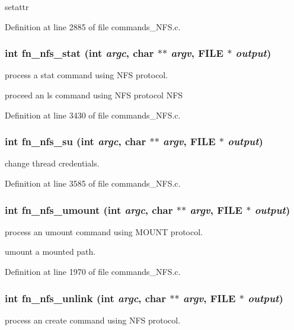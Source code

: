 setattr 

Definition at line 2885 of file commands\_\-NFS.c.
\subsubsection[{fn\_\-nfs\_\-stat}]{\setlength{\rightskip}{0pt plus 5cm}int fn\_\-nfs\_\-stat (int {\em argc}, \/  char $\ast$$\ast$ {\em argv}, \/  FILE $\ast$ {\em output})}\label{commands_8h_a60d880fc087d6b800b305eef1518532b}
process a stat command using NFS protocol.

proceed an ls command using NFS protocol NFS 

Definition at line 3430 of file commands\_\-NFS.c.
\subsubsection[{fn\_\-nfs\_\-su}]{\setlength{\rightskip}{0pt plus 5cm}int fn\_\-nfs\_\-su (int {\em argc}, \/  char $\ast$$\ast$ {\em argv}, \/  FILE $\ast$ {\em output})}\label{commands_8h_a467b8bbb73091f0399b2f9d15a2de9d5}
change thread credentials. 

Definition at line 3585 of file commands\_\-NFS.c.
\subsubsection[{fn\_\-nfs\_\-umount}]{\setlength{\rightskip}{0pt plus 5cm}int fn\_\-nfs\_\-umount (int {\em argc}, \/  char $\ast$$\ast$ {\em argv}, \/  FILE $\ast$ {\em output})}\label{commands_8h_ad3705a7ae5f94ea44dc6ad4da82a38e7}
process an umount command using MOUNT protocol.

umount a mounted path. 

Definition at line 1970 of file commands\_\-NFS.c.
\subsubsection[{fn\_\-nfs\_\-unlink}]{\setlength{\rightskip}{0pt plus 5cm}int fn\_\-nfs\_\-unlink (int {\em argc}, \/  char $\ast$$\ast$ {\em argv}, \/  FILE $\ast$ {\em output})}\label{commands_8h_aa154fe7fc1c4ab72505656deab8feb85}
process an create command using NFS protocol.

